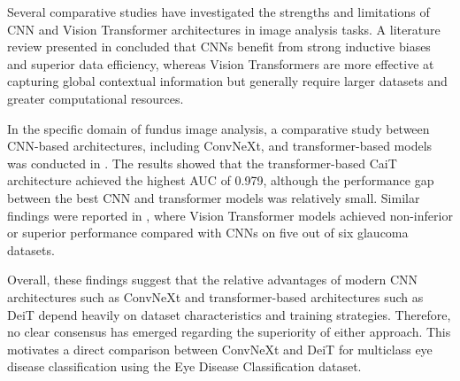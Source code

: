Several comparative studies have investigated the strengths and limitations of CNN and Vision Transformer architectures in image analysis tasks.
A literature review presented in \cite{mauricio2023} concluded that CNNs benefit from strong inductive biases and superior data efficiency, whereas Vision Transformers are more effective at capturing global contextual information but generally require larger datasets and greater computational resources.

In the specific domain of fundus image analysis, a comparative study between CNN-based architectures, including ConvNeXt, and transformer-based models was conducted in \cite{alayon2023}.
The results showed that the transformer-based CaiT architecture achieved the highest AUC of 0.979, although the performance gap between the best CNN and transformer models was relatively small.
Similar findings were reported in \cite{hwang2023}, where Vision Transformer models achieved non-inferior or superior performance compared with CNNs on five out of six glaucoma datasets.

Overall, these findings suggest that the relative advantages of modern CNN architectures such as ConvNeXt and transformer-based architectures such as DeiT depend heavily on dataset characteristics and training strategies.
Therefore, no clear consensus has emerged regarding the superiority of either approach.
This motivates a direct comparison between ConvNeXt and DeiT for multiclass eye disease classification using the Eye Disease Classification dataset.